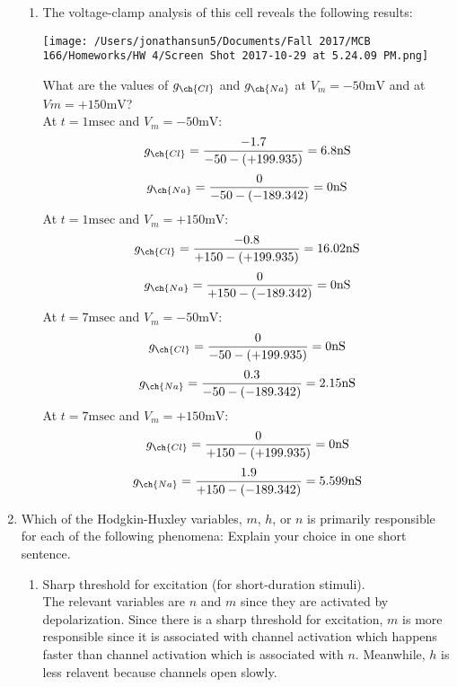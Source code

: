 \documentclass[11pt]{article}
\begin{document}
\begin{enumerate}[label=\arabic*.]
\begin{enumerate}[label=(\alph*)]
\item
The voltage-clamp analysis of this cell reveals the following results:
\begin{center}
\texttt{[image: /Users/jonathansun5/Documents/Fall 2017/MCB 166/Homeworks/HW 4/Screen Shot 2017-10-29 at 5.24.09 PM.png]}
\end{center}
What are the values of $g_{\ch{Cl}}$ and $g_{\ch{Na}}$ at $V_m = -50 \text{mV}$ and at $Vm = +150 \text{mV}$?
\vspace*{1\baselineskip}
\\
At $t = 1 \text{msec}$ and $V_m = -50 \text{mV}$:
\begin{align*}
g_{\ch{Cl}} = \frac{-1.7} {-50 - (+199.935)} = 6.8 \text{nS}
\end{align*}
\begin{align*}
g_{\ch{Na}} = \frac{0} {-50 - (-189.342)} = 0 \text{nS}
\end{align*}
At $t = 1 \text{msec}$ and $V_m = +150 \text{mV}$:
\begin{align*}
g_{\ch{Cl}} = \frac{-0.8} {+150 - (+199.935)} = 16.02 \text{nS}
\end{align*}
\begin{align*}
g_{\ch{Na}} = \frac{0} {+150 - (-189.342)} = 0 \text{nS}
\end{align*}
At $t = 7 \text{msec}$ and $V_m = -50 \text{mV}$:
\begin{align*}
g_{\ch{Cl}} = \frac{0} {-50 - (+199.935)} = 0 \text{nS}
\end{align*}
\begin{align*}
g_{\ch{Na}} = \frac{0.3} {-50 - (-189.342)} = 2.15 \text{nS}
\end{align*}
At $t = 7 \text{msec}$ and $V_m = +150 \text{mV}$:
\begin{align*}
g_{\ch{Cl}} = \frac{0} {+150 - (+199.935)} = 0 \text{nS}
\end{align*}
\begin{align*}
g_{\ch{Na}} = \frac{1.9} {+150 - (-189.342)} = 5.599 \text{nS}
\end{align*}
\end{enumerate}



\newpage
\item
Which of the Hodgkin-Huxley variables, $m$, $h$, or $n$ is primarily responsible for each of the following phenomena: Explain your choice in one short sentence.
\begin{enumerate}[label=(\alph*)]
\item
Sharp threshold for excitation (for short-duration stimuli).
\vspace*{1\baselineskip}
\\
The relevant variables are $n$ and $m$ since they are activated by depolarization. Since there is a sharp threshold for excitation, $m$ is more responsible since it is associated with  channel activation which happens faster than  channel activation which is associated with $n$. Meanwhile, $h$ is less relavent because  channels open slowly.
\\




\end{enumerate}
\end{enumerate}
\end{document}
